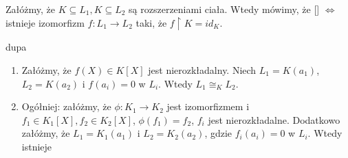 Załóżmy, że $K\subseteq L_1, K\subseteq L_2$ są rozszerzeniami ciała. Wtedy mówimy, że  [] $\iff$ istnieje izomorfizm $f:L_1\to L_2$ taki, że $f\restriction K=id_K$.

\begin{fact}{\color{pagColor}dupa }
\label{fakt:1:2:5}
\begin{enumerate}
\item Załóżmy, że $f(X)\in K[X]$ jest nierozkładalny. Niech $L_1=K(a_1)$, $L_2=K(a_2)$ i $f(a_i)=0$ w $L_i$. Wtedy $L_1\cong_KL_2$.

\item Ogółniej: załóżmy, że $\phi:K_1\to K_2$ jest izomorfizmem i $f_1\in K_1[X],f_2\in K_2[X]$, $\phi(f_1)=f_2$, $f_i$ jest nierozkładalne. Dodatkowo załóżmy, że $L_1=K_1(a_1)$ i $L_2=K_2(a_2)$, gdzie $f_i(a_i)=0$ w $L_i$. Wtedy istnieje 
\end{enumerate}
\end{fact}

